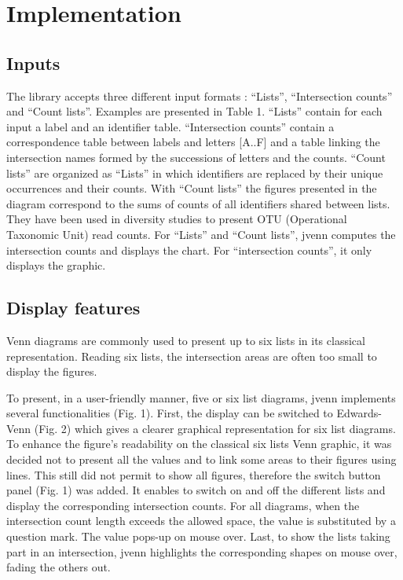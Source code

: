 \documentclass{bmcart}
\begin{document}
\section*{Implementation}

\subsection*{Inputs}

The library accepts three different input formats : ``Lists'', ``Intersection
counts'' and ``Count lists''. Examples are presented in Table 1. ``Lists'' contain
for each input a label and an identifier table. ``Intersection counts'' contain a
correspondence table between labels and letters [A..F] and a table linking the
intersection names formed by the successions of letters and the counts. ``Count
lists'' are organized as ``Lists'' in which identifiers are replaced by their
unique occurrences and their counts. With ``Count lists'' the figures presented
in the diagram correspond to the sums of counts of all identifiers shared
between lists. They have been used in diversity studies to present OTU
(Operational Taxonomic Unit) read counts. For ``Lists'' and ``Count lists'',
jvenn computes the intersection counts and displays the chart. For
``intersection counts'', it only displays the graphic.

\subsection*{Display features}

Venn diagrams are commonly used to present up to six lists in its classical 
representation. Reading six lists, the intersection areas are often too small to
display the figures.

To present, in a user-friendly manner, five or six list diagrams, jvenn implements
several functionalities (Fig. 1). First, the display can be switched to
Edwards-Venn (Fig. 2) which gives a clearer graphical representation for six list diagrams. To
enhance the figure's readability on the classical six lists Venn graphic, it was
decided not to present all the values and to link some areas to their figures
using lines. This still did not permit to show all figures, therefore the switch
button panel (Fig. 1) was added. It enables to switch on and off the different lists
and display the corresponding intersection counts. For all diagrams, when the 
intersection count length exceeds the allowed space, the value is substituted by
a question mark. The value pops-up on mouse over. Last, to show the lists taking
part in an intersection, jvenn highlights the corresponding shapes on mouse
over, fading the others out.
\end{document}
